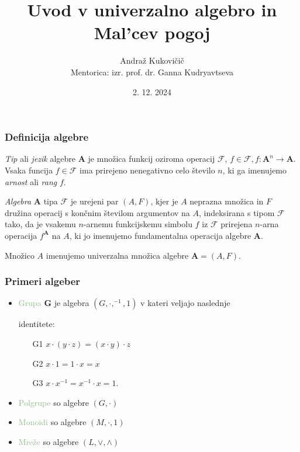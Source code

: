 \documentclass{beamer}
\title{Uvod v univerzalno algebro in Mal'cev pogoj}
\author{Andraž Kukovičič \\ {\small Mentorica: izr. prof. dr. Ganna Kudryavtseva \\}}
\institute{Fakulteta za matematiko in fiziko}
\date{2. 12. 2024}
\newcommand{\FF}{$\mathcal{F}$ }
\begin{document}
\frame{\titlepage}

\begin{frame}
\frametitle{Definicija algebre}

\emph{Tip} ali \emph{jezik} algebre $\mathbf{A}$ je množica funkcij oziroma operacij $\mathcal{F}$,  $f \in \mathcal{F}, f:\mathbf{A}^n \rightarrow \mathbf{A}$.
Vsaka funcija $f \in 
\mathcal{F}$ ima prirejeno nenegativno celo število $n$, ki ga imenujemo \emph{arnost} ali 
\emph{rang} $f$. \\
\pause
\begin{block}{}

\emph{Algebra} $\mathbf{A}$ tipa $\mathcal{F}$ je urejeni par $ \left(A, F\right)$, kjer je $A$ neprazna množica 
in $F$ družina operacij s končnim številom argumentov na $A$, indeksirana s tipom \FF tako, 
da je vsakemu $n$-arnemu funkcijskemu simbolu $f$ iz \FF prirejena $n$-arna operacija $f^\mathbf{A}$ 
na $A$, ki jo imenujemo fundamentalna operacija algebre $\mathbf{A}$. \\

\end{block}
\pause
Množico $A$ imenujemo univerzalna množica algebre $\mathbf{A}  = \left(A, F\right)$. \\
\end{frame}

\begin{frame}
    \frametitle{Primeri algeber}
    \begin{itemize}
        \item \textcolor{darkseagreen}{Grupa} $\mathbf{G}$ je algebra $\left(G, \cdot, ^{-1}, 1\right)$ v kateri veljajo naslednje
        \item[] identitete:
        \begin{itemize}
            \item[G1] $x \cdot \left(y \cdot z\right) = \left(x \cdot y\right) \cdot z$
            \item[G2] $x \cdot 1 = 1 \cdot x = x$
            \item[G3] $x \cdot x^{-1} = x^{-1} \cdot x = 1$.
        \end{itemize}
    \pause
        \item \textcolor{darkseagreen}{Polgrupe} so algebre $\left(G, \cdot\right)$
        \item \textcolor{darkseagreen}{Monoidi} so algebre  $\left(M, \cdot, 1\right)$
        \item \textcolor{darkseagreen}{Mreže} so algebre $\left(L,\vee, \wedge\right)$ 
    \end{itemize}
\end{frame}
\end{document}
